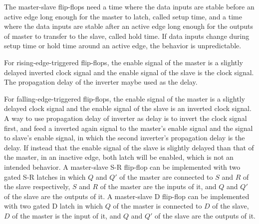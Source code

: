 \documentclass[a4paper,12pt]{report}
\begin{document}
The master-slave flip-flops need a time where the data inputs are stable before an active edge long enough for the master to latch, called setup time, and a time where the data inputs are stable after an active edge long enough for the outputs of master to transfer to the slave, called hold time. If data inputs change during setup time or hold time around an active edge, the behavior is unpredictable.
\bit
\item For rising-edge-triggered flip-flops, the enable signal of the master is a slightly delayed inverted clock signal and the enable signal of the slave is the clock signal. The propagation delay of the inverter maybe used as the delay.
\item For falling-edge-triggered flip-flops, the enable signal of the master is a slightly delayed clock signal and the enable signal of the slave is an inverted clock signal. A way to use propagation delay of inverter as delay is to invert the clock signal first, and feed a inverted again signal to the master's enable signal and the signal to slave's enable signal, in which the second inverter's propagation delay is the delay.
\eit
If instead that the enable signal of the slave is slightly delayed than that of the master, in an inactive edge, both latch will be enabled, which is not an intended behavior.
A master-slave S-R flip-flop can be implemented with two gated S-R latches in which $Q$ and $Q'$ of the master are connected to $S$ and $R$ of the slave respectively, $S$ and $R$ of the master are the inputs of it, and $Q$ and $Q'$ of the slave are the outputs of it.
A master-slave D flip-flop can be implemented with two gated D latch in which $Q$ of the master is connected to $D$ of the slave, $D$ of the master is the input of it, and $Q$ and $Q'$ of the slave are the outputs of it.
\end{document}
